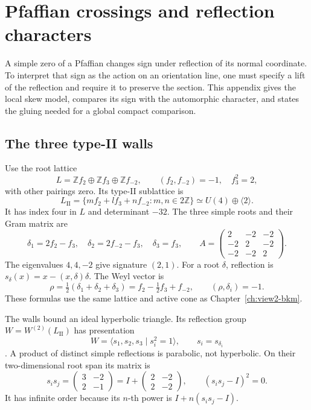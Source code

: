 \section{Pfaffian crossings and reflection characters}
\label{app:pfaffian-wall-normal-form}

A simple zero of a Pfaffian changes sign under reflection of its
normal coordinate. To interpret that sign as the action on an
orientation line, one must specify a lift of the reflection and
require it to preserve the section. This appendix gives the local
skew model, compares its sign with the automorphic character, and
states the gluing needed for a global compact comparison.

\subsection{The three type-II walls}
\label{app:pfaffian-wall-three-walls}

Use the root lattice
\[
 L=\mathbb Zf_2\oplus\mathbb Zf_3\oplus\mathbb Zf_{-2},
 \qquad(f_2,f_{-2})=-1,\quad f_3^2=2,
\]
with other pairings zero. Its type-II sublattice is
\[
 L_{\mathrm{II}}=
 \{mf_2+lf_3+nf_{-2}:m,n\in2\mathbb Z\}
 \simeq U(4)\oplus\langle2\rangle.
\]
It has index four in \(L\) and determinant \(-32\).
The three simple roots and their Gram matrix are
\[
 \delta_1=2f_2-f_3,\quad
 \delta_2=2f_{-2}-f_3,\quad \delta_3=f_3,
 \qquad
 A=\begin{pmatrix}2&-2&-2\\-2&2&-2\\-2&-2&2\end{pmatrix}.
\]
The eigenvalues \(4,4,-2\) give signature \((2,1)\).
For a root \(\delta\), reflection is
\(s_\delta(x)=x-(x,\delta)\delta\).
The Weyl vector is
\[
 \rho=\tfrac12(\delta_1+\delta_2+\delta_3)
       =f_2-\tfrac12f_3+f_{-2},
 \qquad (\rho,\delta_i)=-1.
\]
These formulas use the same lattice and active cone as
Chapter~\ref{ch:view2-bkm}.

The walls bound an ideal hyperbolic triangle. Its reflection group
\(W=W^{(2)}(L_{\mathrm{II}})\) has presentation
\begin{equation}\label{eq:appE-free-product}
 W=\langle s_1,s_2,s_3\mid s_i^2=1\rangle,
 \qquad s_i=s_{\delta_i}
\end{equation}
\cite[Proposition 2.2]{GN}. A product of distinct simple
reflections is parabolic, not hyperbolic. On their two-dimensional
root span its matrix is
\[
 s_is_j=\begin{pmatrix}3&-2\\2&-1\end{pmatrix}
       =I+\begin{pmatrix}2&-2\\2&-2\end{pmatrix},
 \qquad (s_is_j-I)^2=0.
\]
It has infinite order because its \(n\)-th power is
\(I+n(s_is_j-I)\).

